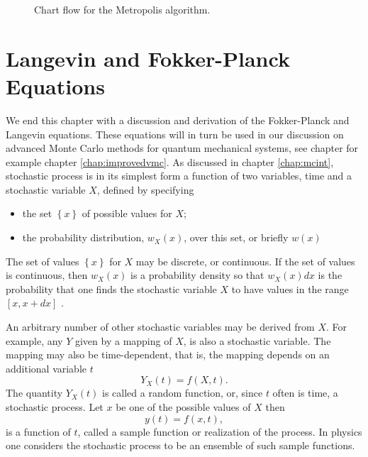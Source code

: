 \begin{figure}
\begin{centering}
\caption{Chart flow for the Metropolis algorithm.}\label{fig:chartFlowMetro}
\end{centering}
\end{figure}

\section{Langevin and Fokker-Planck Equations}
We end this chapter with a discussion and derivation of the Fokker-Planck and Langevin equations.
These equations will in turn be used in our discussion on advanced Monte Carlo methods
for quantum mechanical systems, see chapter for example chapter \ref{chap:improvedvmc}.
As discussed in chapter \ref{chap:mcint},  
stochastic process is in its simplest form a function of two variables, time and 
a stochastic variable $X$, defined by specifying
\begin{itemize}
   \item the set $\left\{x\right\}$ of possible values for $X$;
   \item  the probability distribution, $w_X(x)$, 
over this set, or briefly $w(x)$
\end{itemize}
The set of values $\left\{x\right\}$ for $X$ 
may be discrete, or continuous. If the set of
values is continuous, then $w_X (x)$ is a probability density so that 
$w_X (x)dx$
is the probability that one finds the stochastic variable $X$ to have values
in the range $[x, x + dx]$ .

     An arbitrary number of other stochastic variables may be derived from
$X$. For example, any $Y$ given by a mapping of $X$, is also a stochastic
variable. The mapping may also be time-dependent, that is, the mapping
depends on an additional variable $t$
\[
                              Y_X (t) = f (X, t) .
\]
The quantity $Y_X (t)$ is called a random function, or, since $t$ often is time,
a stochastic process.
Let $x$ be one of the
possible values of $X$ then
\[
                               y(t) = f (x, t),\]
is a function of $t$, called a sample function or realization of the process.
In physics one considers the stochastic process to be an ensemble of such
sample functions.

